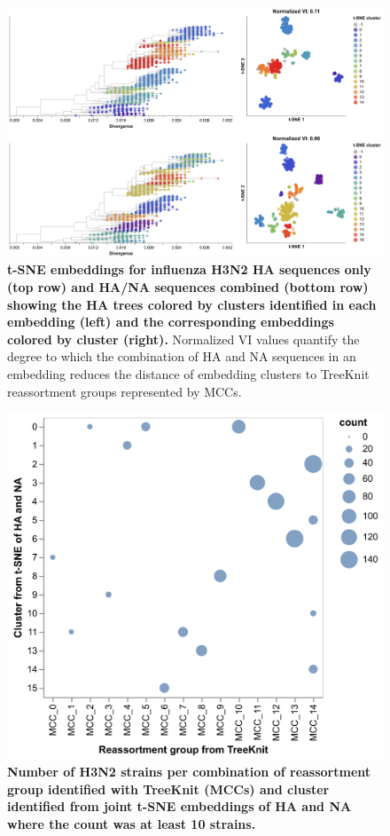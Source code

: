 \begin{figure}[!h]
\includegraphics[width=\columnwidth]{figures/flu-2016-2018-ha-na-tsne-by-cluster.png}
\caption{{\bf t-SNE embeddings for influenza H3N2 HA sequences only (top row) and HA/NA sequences combined (bottom row) showing the HA trees colored by clusters identified in each embedding (left) and the corresponding embeddings colored by cluster (right).}
  Normalized VI values quantify the degree to which the combination of HA and NA sequences in an embedding reduces the distance of embedding clusters to TreeKnit reassortment groups represented by MCCs.}\label{S_Fig_flu_ha_na_tsne_embeddings}
\end{figure}

\begin{figure}[!h]
\includegraphics[width=\columnwidth]{figures/flu-2016-2018-ha-na-tsne-mcc-counts.png}
\caption{{\bf Number of H3N2 strains per combination of reassortment group identified with TreeKnit (MCCs) and cluster identified from joint t-SNE embeddings of HA and NA where the count was at least 10 strains.}}\label{S_Fig_flu_ha_na_tsne_mcc_counts}
\end{figure}

